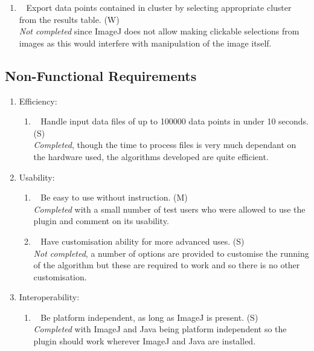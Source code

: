 \begin{enumerate}[label=\arabic*.]
\begin{enumerate}[label*=\arabic*.]
			\item~\label{req:n} Export data points contained in cluster by
				selecting appropriate cluster from the results table. (W) \\
				\emph{Not completed} since ImageJ does not allow making
				clickable selections from images as this would interfere with
				manipulation of the image itself.

		\end{enumerate}
\end{enumerate}

\subsection{Non-Functional Requirements}
\label{sub:non_functional_requirements}

\begin{enumerate}[label=\arabic*.]
	\item Efficiency:
		\begin{enumerate}[label*=\arabic*.]
			\item~\label{req:o} Handle input data files of up to \num{100000}
				data points in under 10 seconds. (S) \\
				\emph{Completed}, though the time to process files is very much
				dependant on the hardware used, the algorithms developed are
				quite efficient.

		\end{enumerate}
	\item Usability:
		\begin{enumerate}[label*=\arabic*.]
			\item~\label{req:p} Be easy to use without instruction. (M) \\
				\emph{Completed} with a small number of test users who were
				allowed to use the plugin and comment on its usability.

			\item~\label{req:q} Have customisation ability for more advanced
				uses. (S) \\
				\emph{Not completed}, a number of options are provided to
				customise the running of the algorithm but these are required
				to work and so there is no other customisation.

		\end{enumerate}
	\item Interoperability:
		\begin{enumerate}[label*=\arabic*.]
			\item~\label{req:r} Be platform independent, as long as ImageJ is
				present. (S) \\
				\emph{Completed} with ImageJ and Java being platform
				independent so the plugin should work wherever ImageJ and Java
				are installed.

		\end{enumerate}
\end{enumerate}
